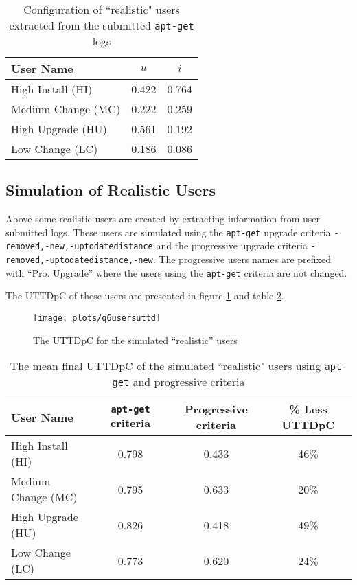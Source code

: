 \begin{table}[h!]
\centering
\begin{tabular}{|l | c | c | }
\hline
User Name 				& 	$u$ 		& $i$ 		\\ \hline
High Install (HI)			& 0.422			& 0.764 	\\
Medium Change (MC)			& 0.222			& 0.259 	\\
High Upgrade (HU)			& 0.561			& 0.192		\\
Low Change 	(LC)			& 0.186			& 0.086 	\\ \hline
\end{tabular}
\caption{Configuration of ``realistic" users extracted from the submitted \texttt{apt-get} logs}
\label{exp.tbluserlogs}
\end{table}

\subsection{Simulation of Realistic Users}
\label{exp.q4}
Above some realistic users are created by extracting information from user submitted logs.
These users are simulated using the \texttt{apt-get} upgrade criteria \texttt{-removed,-new,-uptodatedistance} and the progressive upgrade criteria \texttt{-removed,-uptodatedistance,-new}.
The progressive users names are prefixed  with ``Pro. Upgrade'' where the users using the \texttt{apt-get} criteria are not changed.

The UTTDpC of these users are presented in figure \ref{exp.q6uttdpc} and table \ref{exp.tblq6uttd}.
\begin{figure}[htp]
\begin{center}
  \texttt{[image: plots/q6usersuttd]}
  \caption{The UTTDpC for the simulated ``realistic'' users}
  \label{exp.q6uttdpc}
\end{center}
\end{figure}

\begin{table}[h!]
\centering
\begin{tabular}{|l | c | c | c | }
\hline
User Name 				& \texttt{apt-get} criteria & Progressive criteria 	& \% Less UTTDpC	\\ \hline
High Install (HI)			& 0.798				& 0.433 			& 46\%	\\
Medium Change (MC)			& 0.795				& 0.633 			& 20\% 	\\
High Upgrade (HU)			& 0.826				& 0.418				& 49\%  \\
Low Change 	(LC)			& 0.773				& 0.620 			& 24\%   \\ \hline
\end{tabular}
\caption{The mean final UTTDpC of the simulated ``realistic" users using \texttt{apt-get} and progressive criteria}
\label{exp.tblq6uttd}
\end{table}

